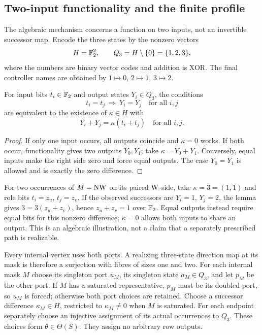 

\subsection{Two-input functionality and the finite profile}

The algebraic mechanism concerns a function on two inputs, not an invertible
successor map. Encode the three states by the nonzero vectors
\[
 H=\mathbb F_2^2,\qquad Q_3=H\setminus\{0\}=\{1,2,3\},
\]
where the numbers are binary vector codes and addition is XOR. The final controller
names are obtained by $1\mapsto0$, $2\mapsto1$, $3\mapsto2$.

\begin{lemma}\label{lem:successor-difference}
For input bits $t_i\in\mathbb F_2$ and output states $Y_i\in Q_3$, the conditions
\[
 t_i=t_j\ \Longrightarrow\ Y_i=Y_j\quad\text{for all }i,j
\]
are equivalent to the existence of $\kappa\in H$ with
\[
 Y_i+Y_j=\kappa(t_i+t_j)\quad\text{for all }i,j.
\]
\end{lemma}
\begin{proof}
If only one input occurs, all outputs coincide and $\kappa=0$ works. If both occur,
functionality gives two outputs $Y_0,Y_1$; take $\kappa=Y_0+Y_1$.
Conversely, equal inputs make the right side zero and force equal outputs.
The case $Y_0=Y_1$ is allowed and is exactly the zero difference.
\end{proof}

For two occurrences of $M=\mathrm{N}\mathrm{W}$ on its paired $\mathrm{W}$-side, take $\kappa=3=(1,1)$ and role bits
$t_i=z_u$, $t_j=z_v$. If the observed successors are $Y_i=1$, $Y_j=2$,
the lemma gives $3=3(z_u+z_v)$, hence $z_u+z_v=1$ over $\mathbb F_2$.
Equal outputs instead require equal bits for this nonzero difference; $\kappa=0$
allows both inputs to share an output. This is an algebraic illustration, not a
claim that a separately prescribed path is realizable.

Every internal vertex uses both ports. A realizing three-state direction map at its
mask is therefore a surjection with fibres of sizes one and two. For each internal
mask $M$ choose its singleton port $u_M$, its singleton state $a_M\in Q_3$, and let
$p_M$ be the other port. If $M$ has a saturated representative, $p_M$ must be its
doubled port, so $u_M$ is forced; otherwise both port choices are retained.
Choose a successor difference $\kappa_M\in H$, restricted to $\kappa_M\ne0$ when
$M$ is saturated. For each endpoint separately choose an injective assignment of
its actual occurrences to $Q_3$. These choices form $\theta\in\Theta(S)$.
They assign no arbitrary row outputs.

